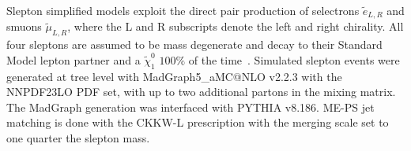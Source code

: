  \iffalse
   \begin{figure}[tbp]
     \texttt{[image: /Users/sheenaschier/Documents/LaFiles/figures/thesis/signal\_samples/ossf\_MET.pdf]}      
      \texttt{[image: /Users/sheenaschier/Documents/LaFiles/figures/thesis/signal\_samples/ossf\_dphi\_j1met.pdf]}
     \texttt{[image: /Users/sheenaschier/Documents/LaFiles/figures/thesis/signal\_samples/ossf\_Jet1Pt.pdf]}
\caption{Jet and \met{} kinematics in electroweakino signal samples, with decays simulated with MadSpin and parton showing performed by PYTHIA v8.186.}
   \label{fig:SigSample2}
 \end{figure}
 \fi

 
Slepton simplified models exploit the direct pair production of selectrons $\tilde{e}_{L,R}$ and smuons $\tilde{\mu}_{L,R}$, where the L and R subscripts denote the left and right chirality.  All four sleptons are assumed to be mass degenerate and decay to their Standard Model lepton partner and a $\tilde\chi_1^0$ $100\%$ of the time~\cite{Ajaib:2015yma}.  Simulated slepton events were generated at tree level with MadGraph5\_aMC@NLO v2.2.3 with the NNPDF23LO PDF set, with up to two additional partons in the mixing matrix.  The MadGraph generation was interfaced with PYTHIA v8.186.  ME-PS jet matching is done with the CKKW-L prescription with the merging scale set to one quarter the slepton mass.
 \FloatBarrier

 \iffalse
\begin{figure}[tbp]
    \centering
 \texttt{[image: /Users/sheenaschier/Documents/LaFiles/figures/thesis/signal\_samples/mll\_theory.pdf]}
 \caption{Dilepton invariant mass distributions simulated with Higgsino (blue) and wino/bino (red) simplified models.  In both models, $m(\chi_2^0, \chi_1^0$ = ($100, 80$) GeV.}
\label{fig:samples:invMass}
\end{figure}
\fi
 \FloatBarrier
 
